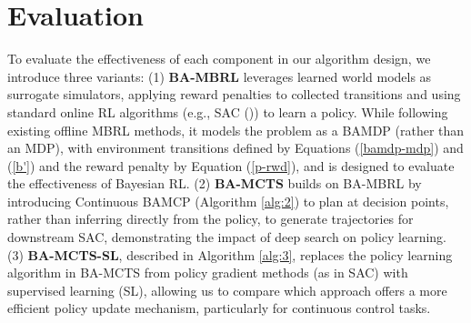 \section{Evaluation} \label{eval}


To evaluate the effectiveness of each component in our algorithm design, we introduce three variants: (1) \textbf{BA-MBRL} leverages learned world models as surrogate simulators, applying reward penalties to collected transitions and using standard online RL algorithms (e.g., SAC (\cite{DBLP:conf/icml/HaarnojaZAL18})) to learn a policy. While following existing offline MBRL methods, it models the problem as a BAMDP (rather than an MDP), with environment transitions defined by Equations (\ref{bamdp-mdp}) and (\ref{b'}) and the reward penalty by Equation (\ref{p-rwd}), and is designed to evaluate the effectiveness of Bayesian RL. (2) \textbf{BA-MCTS} builds on BA-MBRL by introducing Continuous BAMCP (Algorithm \ref{alg:2}) to plan at decision points, rather than inferring directly from the policy, to generate trajectories for downstream SAC, demonstrating the impact of deep search on policy learning. (3) \textbf{BA-MCTS-SL}, described in Algorithm \ref{alg:3}, replaces the policy learning algorithm in BA-MCTS from policy gradient methods (as in SAC) with supervised learning (SL), allowing us to compare which approach offers a more efficient policy update mechanism, particularly for continuous control tasks.
 
